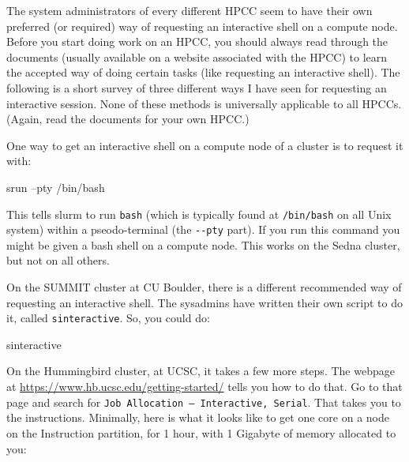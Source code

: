 \documentclass[]{krantz}
\makeatletter
\newenvironment{Shaded}{\begin{snugshade}}{\end{snugshade}}
\newcommand{\CommentTok}[1]{\textcolor[rgb]{0.37,0.37,0.37}{\textit{#1}}}
\newcommand{\ExtensionTok}[1]{#1}
\newcommand{\NormalTok}[1]{#1}
\newcommand{\VariableTok}[1]{\textcolor[rgb]{0,0,0}{#1}}
\newenvironment{kframe}{%
\medskip{}
\setlength{\fboxsep}{.8em}
 \def\at@end@of@kframe{}%
 \ifinner\ifhmode%
  \def\at@end@of@kframe{\end{minipage}}%
  \begin{minipage}{\columnwidth}%
 \fi\fi%
 \def\FrameCommand##1{\hskip\@totalleftmargin \hskip-\fboxsep
 \colorbox{shadecolor}{##1}\hskip-\fboxsep
     \hskip-\linewidth \hskip-\@totalleftmargin \hskip\columnwidth}%
 \MakeFramed {\advance\hsize-\width
   \@totalleftmargin\z@ \linewidth\hsize
   \@setminipage}}%
 {\par\unskip\endMakeFramed%
 \at@end@of@kframe}
\renewenvironment{Shaded}{\begin{kframe}}{\end{kframe}}
\makeatother
\begin{document}
The system administrators of every different HPCC seem to have their own preferred (or required)
way of requesting an interactive shell on a compute node. Before you start doing work
on an HPCC, you should always read through the documents (usually available on a website
associated with the HPCC) to learn the accepted way of doing certain tasks (like requesting
an interactive shell). The following is a short survey of three different ways I have
seen for requesting an interactive session. None of these methods is universally applicable
to all HPCCs. (Again, read the documents for your own HPCC.)

One way to get an interactive shell on a compute node of a cluster is to request it with:

\begin{Shaded}
\begin{Highlighting}[]
\ExtensionTok{srun}\NormalTok{ --pty /bin/bash}
\end{Highlighting}
\end{Shaded}

This tells slurm to run \texttt{bash} (which is typically found at \texttt{/bin/bash} on all Unix system) within
a pseodo-terminal (the \texttt{-\/-pty} part). If you run this command you might be given a bash shell on a compute
node. This works on the Sedna cluster, but not on all others.

On the SUMMIT cluster at CU Boulder, there is
a different recommended way of requesting an interactive shell. The
sysadmins have written their own script to do it, called \texttt{sinteractive}.
So, you could do:

\begin{Shaded}
\begin{Highlighting}[]
\ExtensionTok{sinteractive}
\end{Highlighting}
\end{Shaded}

On the Hummingbird cluster, at UCSC, it takes a few more steps. The webpage at \url{https://www.hb.ucsc.edu/getting-started/}
tells you how to do that. Go to that page and search for \texttt{Job\ Allocation\ –\ Interactive,\ Serial}. That takes you to
the instructions. Minimally, here is what it looks like to get one core
on a node on the Instruction partition, for 1 hour, with 1 Gigabyte of memory
allocated to you:

\begin{Shaded}
\end{Shaded}
\end{document}
